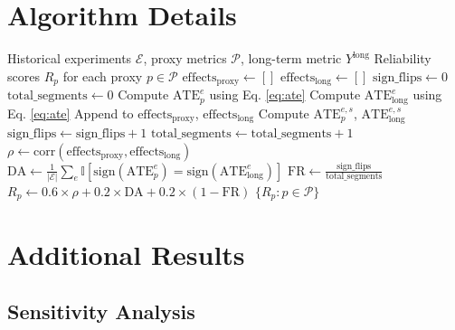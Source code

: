 \documentclass[11pt,twocolumn]{article}
\begin{document}
\appendix

\section{Algorithm Details}

\begin{algorithm}
\caption{PROXIMA Composite Scoring}
\label{alg:proxima}
\begin{algorithmic}[1]
\REQUIRE Historical experiments $\mathcal{E}$, proxy metrics $\mathcal{P}$, long-term metric $Y^{\text{long}}$
\ENSURE Reliability scores $R_p$ for each proxy $p \in \mathcal{P}$
    \STATE $\text{effects}_{\text{proxy}} \gets []$
    \STATE $\text{effects}_{\text{long}} \gets []$
    \STATE $\text{sign\_flips} \gets 0$
    \STATE $\text{total\_segments} \gets 0$
        \STATE Compute $\text{ATE}_p^e$ using Eq. \ref{eq:ate}
        \STATE Compute $\text{ATE}_{\text{long}}^e$ using Eq. \ref{eq:ate}
        \STATE Append to $\text{effects}_{\text{proxy}}$, $\text{effects}_{\text{long}}$
            \STATE Compute $\text{ATE}_p^{e,s}$, $\text{ATE}_{\text{long}}^{e,s}$
                \STATE $\text{sign\_flips} \gets \text{sign\_flips} + 1$
            \ENDIF
            \STATE $\text{total\_segments} \gets \text{total\_segments} + 1$
        \ENDFOR
    \ENDFOR
    \STATE $\rho \gets \text{corr}(\text{effects}_{\text{proxy}}, \text{effects}_{\text{long}})$
    \STATE $\text{DA} \gets \frac{1}{|\mathcal{E}|} \sum_{e} \mathbb{I}[\text{sign}(\text{ATE}_p^e) = \text{sign}(\text{ATE}_{\text{long}}^e)]$
    \STATE $\text{FR} \gets \frac{\text{sign\_flips}}{\text{total\_segments}}$
    \STATE $R_p \gets 0.6 \times \rho + 0.2 \times \text{DA} + 0.2 \times (1 - \text{FR})$ 
\ENDFOR
\RETURN $\{R_p : p \in \mathcal{P}\}$
\end{algorithmic}
\end{algorithm}

\section{Additional Results}

\subsection{Sensitivity Analysis}
\end{document}
